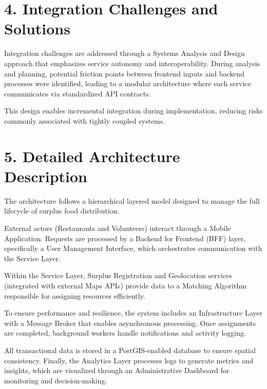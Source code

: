 \documentclass[12pt]{article}
\begin{document}
\section*{4. Integration Challenges and Solutions}

Integration challenges are addressed through a Systems Analysis and Design approach that emphasizes service autonomy and interoperability. During analysis and planning, potential friction points between frontend inputs and backend processes were identified, leading to a modular architecture where each service communicates via standardized API contracts.

This design enables incremental integration during implementation, reducing risks commonly associated with tightly coupled systems.

\section*{5. Detailed Architecture Description}

The architecture follows a hierarchical layered model designed to manage the full lifecycle of surplus food distribution.

External actors (Restaurants and Volunteers) interact through a Mobile Application. Requests are processed by a Backend for Frontend (BFF) layer, specifically a User Management Interface, which orchestrates communication with the Service Layer.

Within the Service Layer, Surplus Registration and Geolocation services (integrated with external Maps APIs) provide data to a Matching Algorithm responsible for assigning resources efficiently.

To ensure performance and resilience, the system includes an Infrastructure Layer with a Message Broker that enables asynchronous processing. Once assignments are completed, background workers handle notifications and activity logging.

All transactional data is stored in a PostGIS-enabled database to ensure spatial consistency. Finally, the Analytics Layer processes logs to generate metrics and insights, which are visualized through an Administrative Dashboard for monitoring and decision-making.
\end{document}
